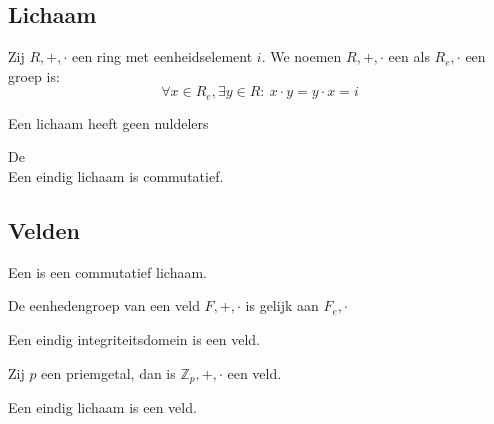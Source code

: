 \documentclass[main.tex]{subfiles}
\begin{document}

\subsection{Lichaam}
\label{sec:lichaam}

\begin{de}
  Zij $R,+,\cdot$ een ring met eenheidselement $i$.
  We noemen $R,+,\cdot$ een  als $R_{e},\cdot$ een groep is:
  \[ \forall x \in R_{e}, \exists y \in R:\ x\cdot y = y \cdot x = i \]
\end{de}

\begin{st}
  Een lichaam heeft geen nuldelers
\end{st}

\begin{st}
  \label{st:stelling-van-wedderburn}
  De \\
  Een eindig lichaam is commutatief.
\end{st}

\subsection{Velden}
\label{sec:velden}

\begin{de}
  Een  is een commutatief lichaam.
\end{de}

\begin{st}
  De eenhedengroep van een veld $F,+,\cdot$ is gelijk aan $F_{e},\cdot$
\end{st}

\begin{st}
  Een eindig integriteitsdomein is een veld.
\end{st}

\begin{gev}
  Zij $p$ een priemgetal, dan is $\mathbb{Z}_{p},+,\cdot$ een veld.
\end{gev}

\begin{st}
  Een eindig lichaam is een veld.
\end{st}
\end{document}
